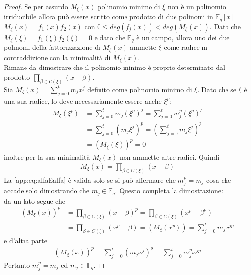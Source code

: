 \begin{proof}
   Se per assurdo $M_{\xi}(x) $ polinomio minimo di $\xi$ non è un polinomio irriducibile allora può essere scritto come prodotto di due polinomi in $\mathbb{F}_{q}[x]$ $M_{\xi}(x) = f_{1}(x) f_{2}(x)$ con $0 \leq deg(f_{j}(x)) < deg(M_{\xi}(x))$. Dato che $M_{\xi}(\xi) = f_{1}(\xi) f_{2}(\xi) = 0 $ e dato che $\mathbb{F}_{q}$ è un campo, allora uno dei due polinomi della fattorizzazione di $M_{\xi}(x)$ ammette $\xi$ come radice in contraddizione con la minimalità di $M_{\xi}(x)$.\\
   Rimane da dimostrare che il polinomio minimo è proprio determinato dal prodotto $ \prod_{\beta \in C(\xi)} (x-\beta)$. \\
   Sia $M_{\xi}(x) = \sum_{j=0}^{t} m_{j}x^{j}$ definito come polinomio minimo di $\xi$. Dato che se $\xi$ è una sua radice, lo deve necessariamente essere anche $\xi^{p}$:
   \begin{align}\label{app:eq:alfaEalfa}
       M_{\xi}(\xi^{p}) 
       &= \sum_{j=0}^{t} m_{j}(\xi^{p})^{j} = \sum_{j=0}^{t} m_{j}^{p}(\xi^{p})^{j} \\
       &= \sum_{j=0}^{t} (m_{j}\xi^{j})^{p} = (\sum_{j=0}^{t} m_{j}\xi^{j})^{p} \\
       &= (M_{\xi}(\xi))^{p} = 0
   \end{align}
   inoltre per la sua minimalità $M_{\xi}(x)$ non ammette altre radici. Quindi
   \begin{align*}
      M_{\xi}(x) = \prod_{\beta \in C(\xi)} (x-\beta)
   \end{align*}
   La \ref{app:eq:alfaEalfa} è valida solo se si può affermare che $m_{j}^{p} = m_{j}$ cosa che accade solo dimostrando che $m_{j} \in \mathbb{F}_{q}$. Questo completa la dimostrazione: \\
   da un lato segue che
   \begin{align*}
       (M_{\xi}(x))^{p} 
       &= \prod_{\beta \in C(\xi)} (x-\beta)^{p} = \prod_{\beta \in C(\xi)} (x^{p} -\beta^{p}) \\
       &= \prod_{\beta \in C(\xi)} (x^{p} -\beta) = (M_{\xi}(x^{p})) = \sum_{j=0}^{t} m_{j}x^{jp}
   \end{align*}  
   e d'altra parte
   \begin{align*}
       (M_{\xi}(x))^{p} =  \sum_{j=0}^{t} (m_{j}x^{j})^{p} =  \sum_{j=0}^{t} m_{j}^{p}x^{jp}
   \end{align*}   
   Pertanto $m_{j}^{p} = m_{j}$ ed $m_{j} \in  \mathbb{F}_{q}$.   
\end{proof}

